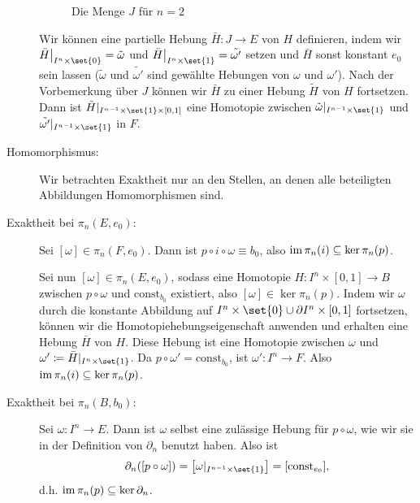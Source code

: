 \begin{beweis}
\begin{description}
\begin{figure}[htbp]
{
			\caption{Die Menge $J$ für $n=2$}}
		\end{figure}
		Wir können eine partielle Hebung $\bar{H} \colon J \to E$ von $H$ definieren, indem wir $\bar{H} \big|_{I^n \times \set{0}} = \tilde{\omega}$ und $\bar{H} \big|_{I^n \times \set{1}} = \tilde{\omega'}$ setzen und $\bar{H}$ sonst konstant $e_0$ sein lassen ($\tilde{\omega}$ und $\tilde{\omega'}$ sind gewählte Hebungen von $\omega$ und $\omega'$). 
		Nach der Vorbemerkung über $J$ können wir $\bar{H}$ zu einer Hebung $\tilde{H}$ von $H$ fortsetzen. 
		Dann ist $\tilde{H} |_{I^{n-1} \times \set{1} \times [0,1] }$ eine Homotopie zwischen $\tilde{\omega} |_{I^{n-1} \times \set{1}}$ und $\tilde{\omega'} |_{I^{n-1} \times \set{1}}$ in $F$.
		\item[Homomorphismus:] Wir betrachten Exaktheit nur an den Stellen, an denen alle beteiligten Abbildungen Homomorphismen sind.
		\item[Exaktheit bei $\pi_n(E,e_0)$:] Sei $[\omega ] \in \pi_n(F, e_0)$. 
		Dann ist $p \circ i \circ \omega \equiv b_0$, also $\operatorname{im} \pi_n (i) \subseteq \ker \pi_n(p)$.
	
		Sei nun $[\omega ] \in \pi_n(E, e_0)$, sodass eine Homotopie $H \colon I^n \times [0,1] \to B$ zwischen $p \circ \omega$ und $\mathrm{const}_{b_0}$ existiert, also $[\omega] \in \ker \pi_n(p)$. 
		Indem wir $\omega$ durch die konstante Abbildung auf $I^n \times \set{0} \cup \partial I^n \times [0,1]$ fortsetzen, können wir die Homotopiehebungseigenschaft anwenden und erhalten eine Hebung $\bar{H}$ von $H$. 
		Diese Hebung ist eine Homotopie zwischen $\omega$ und $\omega' \coloneqq \bar{H} |_{I^n \times \set{1} }$. 
		Da $p \circ \omega' = \mathrm{const}_{b_0}$, ist $\omega' \colon I^n \to F$. 
		Also $\operatorname{im} \pi_n(i) \subseteq \ker \pi_n(p)$.
		\item[Exaktheit bei $\pi_n(B, b_0)$:] Sei $\omega \colon I^n \to E$. 
		Dann ist $\omega$ selbst eine zulässige Hebung für $p \circ \omega$, wie wir sie in der Definition von $\partial_n$ benutzt haben. 
		Also ist
		\[
			\partial_n \enbrace*{[p \circ \omega]} = \benbrace*{\omega |_{I^{n-1} \times \set{1}}}  = \benbrace*{\mathrm{const}_{e_0}}, 
		\]
		d.h. $\operatorname{im} \pi_n(p) \subseteq \ker \partial_n$.
	

\end{description}
\end{beweis}
